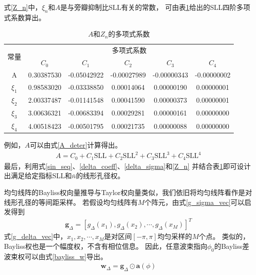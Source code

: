 \documentclass[master]{thesis-uestc}
\begin{document}
式\eqref{Z_n}中，$\xi_n$和$A$是与旁瓣抑制比SLL有关的常数，
可由表\ref{Z_n_coeff_tab}给出的SLL四阶多项式系数算出。
\begin{table}[h]
    \caption{$A$和$Z_n$的多项式系数}
    \begin{tabular}{|c|c|c|c|c|c|}
    \hline
    \multirow{2}{*}{常量}  & \multicolumn{5}{|c|}{多项式系数}  \\
    \cline{2-6}
    & $C_0$ & $C_1$ & $C_2$ & $C_3$ & $C_4$ \\
    \cline{1-6}
    A & 0.30387530 & -0.05042922 & -0.00027989 & -0.00000343 & -0.00000002 \\
    \cline{1-6}
    $\xi_1$ & 0.98583020 & -0.03338850 & 0.00014064 & 0.00000190 & 0.00000001 \\
    \cline{1-6}
    $\xi_2$ & 2.00337487 & -0.01141548 & 0.00041590 & 0.00000373 & 0.00000001 \\
    \cline{1-6}
    $\xi_3$ & 3.00636321 & -0.00683394 & 0.00029281 & 0.00000161 & 0.00000000 \\
    \cline{1-6}
    $\xi_4$ & 4.00518423 & -0.00501795 & 0.00021735 & 0.00000088 & 0.00000000 \\
    \hline
    \end{tabular}
    \label{Z_n_coeff_tab}
\end{table}

例如，$A$可以由式\eqref{A_deter}计算得出。
\begin{equation}\label{A_deter}
    \begin{aligned}
        A = C_0 + C_1\text{SLL} + C_2\text{SLL}^2 + C_3\text{SLL}^3 + C_4\text{SLL}^4
    \end{aligned}
\end{equation}
最后，利用式\eqref{sin_seq}、\eqref{delta_coeff}、\eqref{delta_sigma}和\eqref{Z_n}
并结合表\ref{Z_n_coeff_tab}即可设计出满足给定指标SLL和$\bar{n}$的线形孔径权。

均匀线阵的Bayliss权向量推导与Taylor权向量类似，我们依旧将均匀线阵看作是对线形孔径的等间距采样。
若假设均匀线阵有$M$个阵元，由式\eqref{g_sigma_vec}可以启发得到
\begin{equation}\label{g_delta_vec}
    \begin{aligned}
        \bm{g}_{\Delta}=\left[g_{\Delta}\left(x_{1}\right), 
        g_{\Delta}\left(x_{2}\right), \cdots, g_{\Delta}\left(x_{M}\right)\right]^{T}
    \end{aligned}
\end{equation}
式\eqref{g_delta_vec}中，$x_1,x_2,\cdots,x_M$是对区间$\left[-\pi,\pi\right]$均匀采样的$M$个点。
类似的，Bayliss权也是一个幅度权，不含有相位信息。
因此，任意波束指向$\phi_0$的Bayliss差波束权可以由式\eqref{bayliss_w}导出。
\begin{equation}\label{bayliss_w}
    \begin{aligned}
        \bm{w}_\Delta = \bm{g}_\Delta \odot \bm{a}(\phi)
    \end{aligned}
\end{equation}
\end{document}
